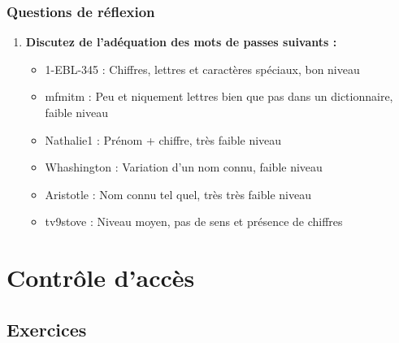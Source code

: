 \documentclass{report}
\begin{document}
		\subsection{Questions de réflexion}

			\begin{enumerate}
				\item \textbf{Discutez de l'adéquation des mots de passes suivants :}\\
					\begin{itemize}
						\item 1-EBL-345 : Chiffres, lettres et caractères spéciaux, bon niveau
						\item mfmitm : Peu et niquement lettres bien que pas dans un dictionnaire, faible niveau
						\item Nathalie1 : Prénom + chiffre, très faible niveau
						\item Whashington : Variation d'un nom connu, faible niveau
						\item Aristotle : Nom connu tel quel, très très faible niveau
						\item tv9stove : Niveau moyen, pas de sens et présence de chiffres
					\end{itemize}
			\end{enumerate}

\chapter{Contrôle d'accès}
	
	\section{Exercices}
\end{document}
